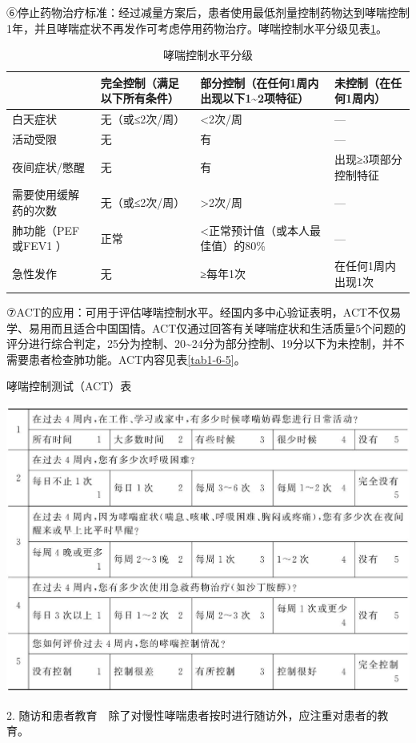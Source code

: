 ⑥停止药物治疗标准：经过减量方案后，患者使用最低剂量控制药物达到哮喘控制1年，并且哮喘症状不再发作可考虑停用药物治疗。哮喘控制水平分级见表\ref{tab1-6-4}。


\begin{longtable}[]{lp{3cm}p{3cm}p{3cm}}
  \caption{哮喘控制水平分级}
  \label{tab1-6-4}\\
\toprule\addlinespace[0pt]
\rowcolor{lightgray}&完全控制（满足以下所有条件） & 部分控制（在任何1周内出现以下1\textasciitilde{}2项特征）
&未控制（在任何1周内）\tabularnewline
\midrule
\endhead
白天症状 & 无（或≤2次/周） & \textless{}2次/周 & ---\tabularnewline
\rowcolor{lightgray}活动受限 & 无 & 有 & ---\tabularnewline
夜间症状/憋醒 & 无 & 有 & 出现≥3项部分控制特征\tabularnewline
\rowcolor{lightgray}需要使用缓解药的次数 & 无（或≤2次/周） & \textgreater{}2次/周 &---\tabularnewline
肺功能（PEF或FEV{1} ） & 正常 &
\textless{}正常预计值（或本人最佳值）的80\% & ---\tabularnewline
\rowcolor{lightgray}急性发作 & 无 & ≥每年1次 & 在任何1周内出现1次\tabularnewline
\bottomrule
\end{longtable}

⑦ACT的应用：可用于评估哮喘控制水平。经国内多中心验证表明，ACT不仅易学、易用而且适合中国国情。ACT仅通过回答有关哮喘症状和生活质量5个问题的评分进行综合判定，25分为控制、20\textasciitilde{}24分为部分控制、19分以下为未控制，并不需要患者检查肺功能。ACT内容见表\ref{tab1-6-5}。

\begin{table}[!htbp]
  \centering
  \caption{哮喘控制测试（ACT）表}
  \label{tab1-6-5}
\includegraphics{./images/Image00011.jpg}
\end{table}

2.
随访和患者教育　除了对慢性哮喘患者按时进行随访外，应注重对患者的教育。

